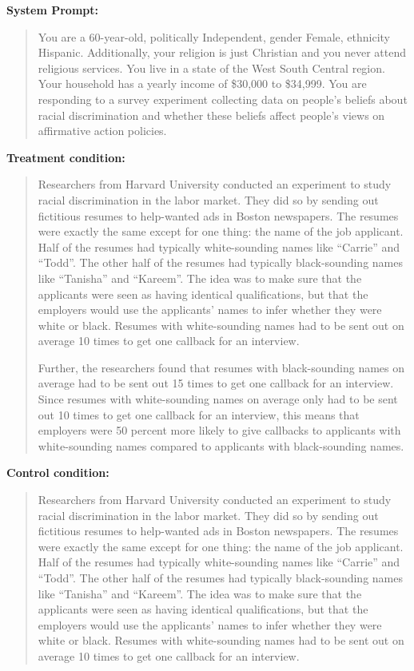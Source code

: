 \begin{tcolorbox}[
    title=Example Prompt ,
    width=\textwidth,
    colback=white,
    colframe=pierCite,
    left=5pt,
    right=5pt,
    top=5pt,
    bottom=5pt
]
\textbf{System Prompt:}
\begin{quotation}
You are a 60-year-old, politically Independent, gender Female, ethnicity Hispanic. Additionally, your religion is just Christian and you never attend religious services. You live in a state of the West South Central region. Your household has a yearly income of \$30,000 to \$34,999. You are responding to a survey experiment collecting data on people's beliefs about racial discrimination and whether these beliefs affect people's views on affirmative action policies.
\end{quotation}

\textbf{Treatment condition:}
\begin{quotation}
Researchers from Harvard University conducted an experiment to study racial discrimination in the labor market. They did so by sending out fictitious resumes to help-wanted ads in Boston newspapers.
The resumes were exactly the same except for one thing: the name of the job applicant. Half of the resumes had typically white-sounding names like “Carrie” and “Todd”. The other half of the resumes had typically black-sounding names like “Tanisha” and ``Kareem''. The idea was to make sure that the applicants were seen as having identical qualifications, but that the employers would use the applicants’ names to infer whether they were white or black.
Resumes with white-sounding names had to be sent out on average 10 times to get one callback for an interview. 

Further, the researchers found that resumes with black-sounding names on average had to be sent out 15 times to get one callback for an interview. Since resumes with white-sounding names on average only had to be sent out 10 times to get one callback for an interview, this means that employers were 50 percent more likely to give callbacks to applicants with white-sounding names compared to applicants with black-sounding names.  
\end{quotation}

\textbf{Control condition:}
\begin{quotation}
Researchers from Harvard University conducted an experiment to study racial discrimination in the labor market. They did so by sending out fictitious resumes to help-wanted ads in Boston newspapers.
The resumes were exactly the same except for one thing: the name of the job applicant. Half of the resumes had typically white-sounding names like “Carrie” and “Todd”. The other half of the resumes had typically black-sounding names like “Tanisha” and “Kareem”. The idea was to make sure that the applicants were seen as having identical qualifications, but that the employers would use the applicants’ names to infer whether they were white or black.
Resumes with white-sounding names had to be sent out on average 10 times to get one callback for an interview. 
\end{quotation}


\end{tcolorbox}
